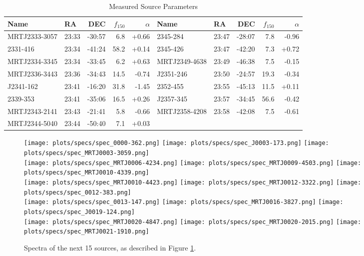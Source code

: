 \documentclass[preprint]{aastex}
\begin{document}
\begin{table}[ht]
\caption{Measured Source Parameters}
\begin{tabular}{l|lrrr||l|lrrr}
\hline
Name & RA & DEC & $f_{150}$ & $\alpha$ & Name & RA & DEC & $f_{150}$ & $\alpha$
\\
\hline
MRTJ2333-3057 & 23:33 & -30:57 &    6.8 & +0.66 &   2345-284 & 23:47 & -28:07 &    7.8 & -0.96 \\
  2331-416 & 23:34 & -41:24 &   58.2 & +0.14 &   2345-426 & 23:47 & -42:20 &    7.3 & +0.72 \\
MRTJ2334-3345 & 23:34 & -33:45 &    6.2 & +0.63 & MRTJ2349-4638 & 23:49 & -46:38 &    7.5 & -0.15 \\
MRTJ2336-3443 & 23:36 & -34:43 &   14.5 & -0.74 &  J2351-246 & 23:50 & -24:57 &   19.3 & -0.34 \\
 J2341-162 & 23:41 & -16:20 &   31.8 & -1.45 &   2352-455 & 23:55 & -45:13 &   11.5 & +0.11 \\
  2339-353 & 23:41 & -35:06 &   16.5 & +0.26 &  J2357-345 & 23:57 & -34:45 &   56.6 & -0.42 \\
MRTJ2343-2141 & 23:43 & -21:41 &    5.8 & -0.66 & MRTJ2358-4208 & 23:58 & -42:08 &    7.5 & -0.61 \\
MRTJ2344-5040 & 23:44 & -50:40 &    7.1 & +0.03 & & & & & \\
\hline
\end{tabular}
\end{table}


\clearpage


\begin{figure}\centering
\texttt{[image: plots/specs/spec\_0000-362.png]}
\texttt{[image: plots/specs/spec\_J0003-173.png]}
\texttt{[image: plots/specs/spec\_MRTJ0003-3059.png]}\\
\texttt{[image: plots/specs/spec\_MRTJ0006-4234.png]}
\texttt{[image: plots/specs/spec\_MRTJ0009-4503.png]}
\texttt{[image: plots/specs/spec\_MRTJ0010-4339.png]}\\
\texttt{[image: plots/specs/spec\_MRTJ0010-4423.png]}
\texttt{[image: plots/specs/spec\_MRTJ0012-3322.png]}
\texttt{[image: plots/specs/spec\_0012-383.png]}\\
\texttt{[image: plots/specs/spec\_0013-147.png]}
\texttt{[image: plots/specs/spec\_MRTJ0016-3827.png]}
\texttt{[image: plots/specs/spec\_J0019-124.png]}\\
\texttt{[image: plots/specs/spec\_MRTJ0020-4847.png]}
\texttt{[image: plots/specs/spec\_MRTJ0020-2015.png]}
\texttt{[image: plots/specs/spec\_MRTJ0021-1910.png]}\\
\caption{Spectra of the next 15 sources, as described in Figure \ref{fig:src_spec1}.
}\label{fig:src_spec1}
\end{figure}\clearpage
\end{document}
